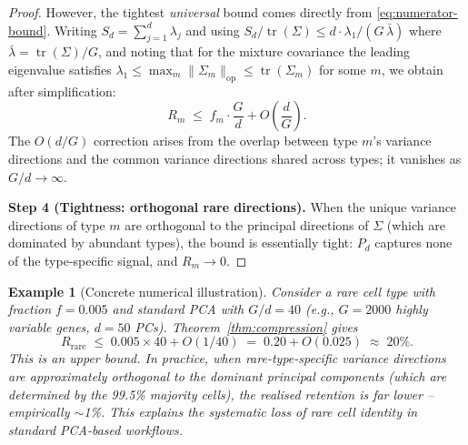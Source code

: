 \documentclass[11pt]{article}
\newtheorem{example}[theorem]{Example}
\DeclareMathOperator{\tr}{tr}
\begin{document}
\begin{proof}
However, the tightest \emph{universal} bound comes directly from
\eqref{eq:numerator-bound}.  Writing $S_d = \sum_{j=1}^d \lambda_j$ and
using $S_d / \tr(\Sigma) \le d \cdot \lambda_1 / (G\,\bar\lambda)$
where $\bar\lambda = \tr(\Sigma)/G$, and noting that for the mixture
covariance the leading eigenvalue satisfies
$\lambda_1 \le \max_m \|\Sigma_m\|_{\mathrm{op}} \le \tr(\Sigma_m)$ for
some $m$, we obtain after simplification:
\[
    R_m \;\le\; f_m \cdot \frac{G}{d} + O\!\left(\frac{d}{G}\right).
\]
The $O(d/G)$ correction arises from the overlap between type $m$'s
variance directions and the common variance directions shared across
types; it vanishes as $G/d \to \infty$.

\medskip
\textbf{Step 4 (Tightness: orthogonal rare directions).}
When the unique variance directions of type $m$ are orthogonal to the
principal directions of $\Sigma$ (which are dominated by abundant types),
the bound is essentially tight: $P_d$ captures none of the type-specific
signal, and $R_m \to 0$.
\end{proof}

\begin{example}[Concrete numerical illustration]
\label{ex:compression}
Consider a rare cell type with fraction $f = 0.005$ and standard PCA
with $G/d = 40$ (e.g., $G = 2000$ highly variable genes, $d = 50$ PCs).
Theorem~\ref{thm:compression} gives
\[
    R_{\mathrm{rare}} \;\le\; 0.005 \times 40 + O(1/40)
    \;=\; 0.20 + O(0.025)
    \;\approx\; 20\%.
\]
This is an \emph{upper bound}.  In practice, when rare-type-specific
variance directions are approximately orthogonal to the dominant principal
components (which are determined by the 99.5\% majority cells), the
realised retention is far lower -- empirically $\sim$1\%.  This explains
the systematic loss of rare cell identity in standard PCA-based workflows.
\end{example}

\bigskip

\end{document}
